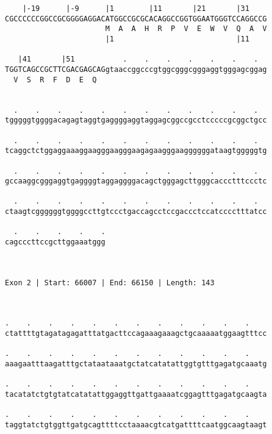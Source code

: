 \documentclass{article}
\begin{document}
\begin{Verbatim}
    |-19      |-9      |1        |11       |21       |31    
CGCCCCCCGGCCGCGGGGAGGACATGGCCGCGCACAGGCCGGTGGAATGGGTCCAGGCCG
                       M  A  A  H  R  P  V  E  W  V  Q  A  V
                       |1                            |11    
  
   |41       |51           .    .    .    .    .    .    .  
TGGTCAGCCGCTTCGACGAGCAGgtaaccggcccgtggcgggcgggaggtgggagcggag
  V  S  R  F  D  E  Q                                       
                                                            
  
  .    .    .    .    .    .    .    .    .    .    .    .  
tgggggtggggacagagtaggtgaggggaggtaggagcggccgcctcccccgcggctgcc
                                                            
  .    .    .    .    .    .    .    .    .    .    .    .  
tcaggctctggaggaaaggaagggaagggaagagaagggaaggggggataagtgggggtg
                                                            
  .    .    .    .    .    .    .    .    .    .    .    .  
gccaaggcgggaggtgaggggtaggaggggacagctgggagcttgggcaccctttccctc
                                                            
  .    .    .    .    .    .    .    .    .    .    .    .  
ctaagtcggggggtggggccttgtccctgaccagcctccgaccctccatcccctttatcc
                                                            
  .    .    .    .    .
cagcccttccgcttggaaatggg
                       
                       
 
Exon 2 | Start: 66007 | End: 66150 | Length: 143



.    .    .    .    .    .    .    .    .    .    .    .    
ctattttgtagatagagatttatgacttccagaaagaaagctgcaaaaatggaagtttcc
                                                            
.    .    .    .    .    .    .    .    .    .    .    .    
aaagaatttaagatttgctataataaatgctatcatatattggtgtttgagatgcaaatg
                                                            
.    .    .    .    .    .    .    .    .    .    .    .    
tacatatctgtgtatcatatattggaggttgattgaaaatcggagtttgagatgcaagta
                                                            
.    .    .    .    .    .    .    .    .    .    .    .    
taggtatctgtggttgatgcagttttcctaaaacgtcatgattttcaatggcaagtaagt
                                                            

\end{Verbatim}
\end{document}
